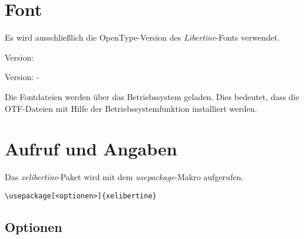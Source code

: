 \documentclass{fontdoku}
\begin{document}
\section{Font}

Es wird ausschließlich die OpenType-Version des \emph{Libertine}-Fonts verwendet.




\begin{description}
\item[\XeTeX] Version: \the\XeTeXversion\XeTeXrevision
\item[xelibertine] Version: \libertineVersionDate\space-\space\libertineVersion
\end{description}


Die Fontdateien werden über das Betriebssystem geladen. Dies bedeutet, dass die OTF-Dateien mit Hilfe der Betriebssystemfunktion installiert werden.

\section{Aufruf und Angaben}

Das \emph{xelibertine}-Paket wird mit dem \emph{usepackage}-Makro aufgerufen.

\begin{lstlisting}
\usepackage[<optionen>]{xelibertine}
\end{lstlisting}

\subsection{Optionen}
\end{document}
